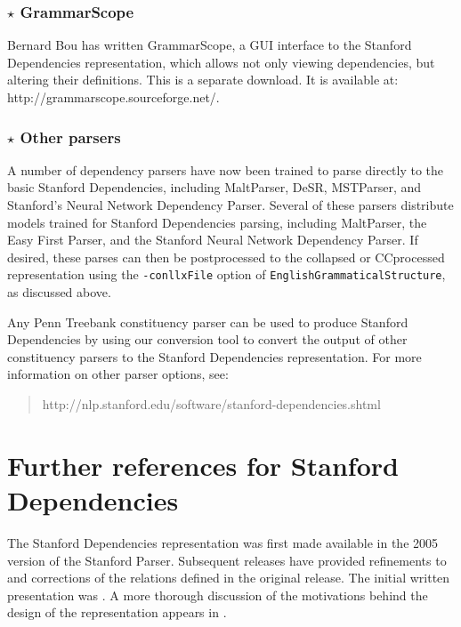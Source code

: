 \documentclass[11pt,letterpaper]{article}
\def\url#1{\textsf{#1}}
\begin{document}
\subsubsection*{$\star$ \textbf{GrammarScope}}
Bernard Bou has written \textsf{GrammarScope}, a GUI interface to the Stanford
Dependencies representation, which allows not only viewing
dependencies, but altering their definitions.  This is a separate download.  It is available at:
\url{http://grammarscope.sourceforge.net/}.

\subsubsection*{$\star$ \textbf{Other parsers}}

A number of dependency parsers have now been trained to parse directly
to the basic Stanford Dependencies, including MaltParser, DeSR,
MSTParser, and Stanford's Neural Network Dependency Parser.  Several of these parsers distribute models trained for
Stanford Dependencies parsing, including MaltParser, the Easy First
Parser, and the Stanford Neural Network Dependency Parser.  If desired, these parses can then be postprocessed to the collapsed or CCprocessed representation using the \texttt{-conllxFile} option of \texttt{EnglishGrammaticalStructure}, as discussed above.

Any Penn Treebank constituency parser can be used to produce Stanford
Dependencies by using our conversion tool to convert the output of other constituency parsers to the Stanford Dependencies representation.  For more information on other parser options, see:
\begin{quote}
\url{http://nlp.stanford.edu/software/stanford-dependencies.shtml}
\end{quote}

\section{Further references for Stanford Dependencies}\label{refs}

The Stanford Dependencies representation was first made available in
the 2005 version of the Stanford Parser.  Subsequent releases have
provided refinements to and corrections of the relations defined
in the original release.  The initial written presentation was
\citep{demarneffe06generating}.  A more thorough discussion of the
motivations behind the design of the representation appears in
\citep{demarneffe08stanford}.
\end{document}
